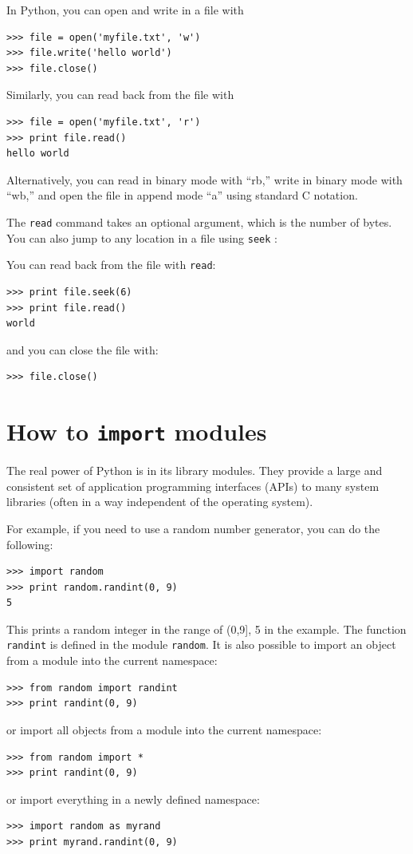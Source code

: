 \documentclass[justified,sixbynine]{tufte-book}
\def\ft{\small\tt}
\theoremstyle{plain}%
\theoremstyle{definition}
\theoremstyle{remark}
\begin{document}
\begin{fullwidth}
In Python, you can open and write in a file with
\begin{lstlisting}
>>> file = open('myfile.txt', 'w')
>>> file.write('hello world')
>>> file.close()
\end{lstlisting}

Similarly, you can read back from the file with
\begin{lstlisting}
>>> file = open('myfile.txt', 'r')
>>> print file.read()
hello world
\end{lstlisting}

Alternatively, you can read in binary mode with ``rb,'' write in binary mode with ``wb,'' and open the file in append mode ``a'' using standard C notation.

The {\ft read} command takes an optional argument, which is the number of bytes. You can also jump to any location in a file using {\ft seek}
:

You can read back from the file with {\ft read}:
\begin{lstlisting}
>>> print file.seek(6)
>>> print file.read()
world
\end{lstlisting}
\noindent and you can close the file with:
\begin{lstlisting}
>>> file.close()
\end{lstlisting}

\goodbreak\section{How to {\ft import} modules}

 
The real power of Python is in its library modules. They provide a large and consistent set of application programming interfaces (APIs) to many system libraries (often in a way independent of the operating system).

For example, if you need to use a random number generator, you can do the following:
\begin{lstlisting}
>>> import random
>>> print random.randint(0, 9)
5
\end{lstlisting}

This prints a random integer in the range of (0,9], 5 in the example. The function {\ft randint} is defined in the module {\ft random}. It is also possible to import an object from a module into the current namespace:
\begin{lstlisting}
>>> from random import randint
>>> print randint(0, 9)
\end{lstlisting}
\noindent or import all objects from a module into the current namespace:
\begin{lstlisting}
>>> from random import *
>>> print randint(0, 9)
\end{lstlisting}
\noindent or import everything in a newly defined namespace:
\begin{lstlisting}
>>> import random as myrand
>>> print myrand.randint(0, 9)
\end{lstlisting}


\end{fullwidth}
\end{document}
